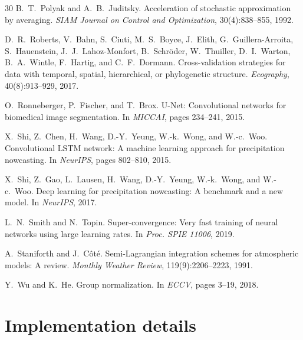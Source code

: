 \documentclass[10pt]{article}
\begin{document}
\begin{thebibliography}{30}
 B.~T.~Polyak and A.~B.~Juditsky. Acceleration of stochastic approximation by averaging. \emph{SIAM Journal on Control and Optimization}, 30(4):838--855, 1992.

 D.~R.~Roberts, V.~Bahn, S.~Ciuti, M.~S.~Boyce, J.~Elith, G.~Guillera-Arroita, S.~Hauenstein, J.~J.~Lahoz-Monfort, B.~Schr\"oder, W.~Thuiller, D.~I.~Warton, B.~A.~Wintle, F.~Hartig, and C.~F.~Dormann. Cross-validation strategies for data with temporal, spatial, hierarchical, or phylogenetic structure. \emph{Ecography}, 40(8):913--929, 2017.

 O.~Ronneberger, P.~Fischer, and T.~Brox. U-Net: Convolutional networks for biomedical image segmentation. In \emph{MICCAI}, pages 234--241, 2015.

 X.~Shi, Z.~Chen, H.~Wang, D.-Y.~Yeung, W.-k.~Wong, and W.-c.~Woo. Convolutional LSTM network: A machine learning approach for precipitation nowcasting. In \emph{NeurIPS}, pages 802--810, 2015.

 X.~Shi, Z.~Gao, L.~Lausen, H.~Wang, D.-Y.~Yeung, W.-k.~Wong, and W.-c.~Woo. Deep learning for precipitation nowcasting: A benchmark and a new model. In \emph{NeurIPS}, 2017.

 L.~N.~Smith and N.~Topin. Super-convergence: Very fast training of neural networks using large learning rates. In \emph{Proc. SPIE 11006}, 2019.

 A.~Staniforth and J.~C\^ot\'e. Semi-Lagrangian integration schemes for atmospheric models: A review. \emph{Monthly Weather Review}, 119(9):2206--2223, 1991.

 Y.~Wu and K.~He. Group normalization. In \emph{ECCV}, pages 3--19, 2018.

\end{thebibliography}
\normalsize

\appendix
\section{Implementation details}
\label{app:impl}
\end{document}
